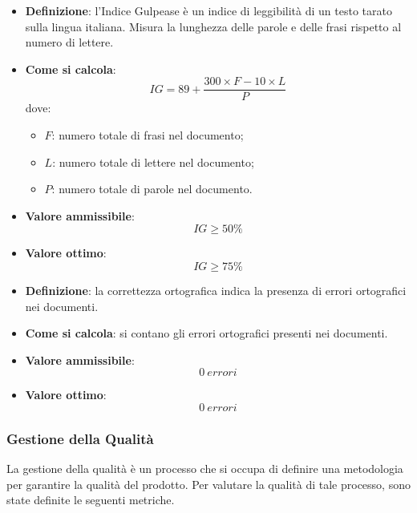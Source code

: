 \hypertarget{19M}{}
\begin{itemize}
	\item \textbf{Definizione}: l'Indice Gulpease è un indice di leggibilità di un testo tarato sulla lingua italiana. Misura la lunghezza delle parole e delle frasi rispetto al numero di lettere.
	\item \textbf{Come si calcola}: \begin{equation*}IG = 89 + \frac{300 \times F - 10 \times L}{P}\end{equation*} dove:
		\begin{itemize}
			\item $F$: numero totale di frasi nel documento;
			\item $L$: numero totale di lettere nel documento;
			\item $P$: numero totale di parole nel documento.
		\end{itemize}
	\item \textbf{Valore ammissibile}: \begin{equation*}IG \geq 50\%\end{equation*}
	\item \textbf{Valore ottimo}: \begin{equation*}IG \geq 75\%\end{equation*}
\end{itemize}

\hypertarget{20M}{}
\begin{itemize}
	\item \textbf{Definizione}: la correttezza ortografica indica la presenza di errori ortografici nei documenti.
	\item \textbf{Come si calcola}: si contano gli errori ortografici presenti nei documenti.
	\item \textbf{Valore ammissibile}: \begin{equation*}0\ errori\end{equation*}
	\item \textbf{Valore ottimo}: \begin{equation*}0\ errori\end{equation*}
\end{itemize}


\subsubsection{Gestione della Qualità}
La gestione della qualità è un processo che si occupa di definire una metodologia per garantire la qualità del prodotto. Per valutare la qualità di tale processo, sono state definite le seguenti metriche.

